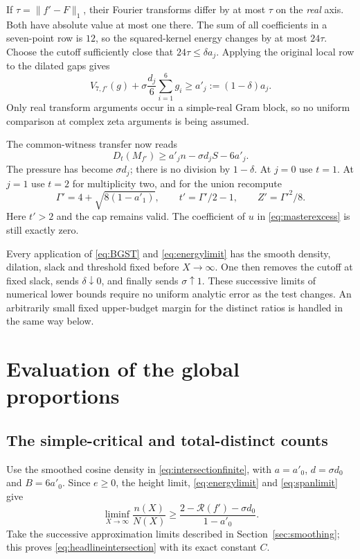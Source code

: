 \documentclass[11pt]{amsart}
\numberwithin{equation}{section}
\begin{document}
If $\tau=\|f'-F\|_1$, their Fourier transforms differ by at most
$\tau$ on the \emph{real} axis. Both have absolute value at most
one there. The sum of all coefficients in a seven-point row is
$12$, so the squared-kernel energy changes by at most $24\tau$.
Choose the cutoff sufficiently close that $24\tau\le\delta a_j$.
Applying the original local row to the dilated gaps gives
\begin{equation}
 V_{7,f'}(g)+\sigma\frac{d_j}{6}\sum_{i=1}^6g_i
       \ge a'_j:=(1-\delta)a_j.\label{eq:smoothedrow}
\end{equation}
Only real transform arguments occur in a simple-real Gram block, so
no uniform comparison at complex zeta arguments is being assumed.

The common-witness transfer now reads
\begin{equation}
 D_t(M_{f'})\ge a'_j n-\sigma d_j S-6a'_j.
 \label{eq:smootheddefect}
\end{equation}
The pressure has become $\sigma d_j$; there is no division by
$1-\delta$. At $j=0$ use $t=1$. At $j=1$ use $t=2$ for
multiplicity two, and for the union recompute
\begin{equation}
 \Gamma'=4+\sqrt{8(1-a'_1)},\qquad
 t'=\Gamma'/2-1,\qquad Z'=\Gamma'^2/8.\label{eq:slackthreshold}
\end{equation}
Here $t'>2$ and the cap remains valid. The coefficient of $u$ in
\eqref{eq:masterexcess} is still exactly zero.

Every application of \eqref{eq:BGST} and \eqref{eq:energylimit}
has the smooth density, dilation, slack and threshold fixed before
$X\to\infty$. One then removes the cutoff at fixed slack, sends
$\delta\downarrow0$, and finally sends $\sigma\uparrow1$.
These successive limits of numerical lower bounds require no
uniform analytic error as the test changes. An arbitrarily small
fixed upper-budget margin for the distinct ratios is handled in
the same way below.

\section{Evaluation of the global proportions}
\label{sec:global}

\subsection{The simple-critical and total-distinct counts}

Use the smoothed cosine density in \eqref{eq:intersectionfinite},
with $a=a'_0$, $d=\sigma d_0$ and $B=6a'_0$. Since $e\ge0$,
the height limit, \eqref{eq:energylimit} and \eqref{eq:spanlimit}
give
\[
 \liminf_{X\to\infty}\frac{n(X)}{N(X)}
 \ge\frac{2-\mathcal R(f')-\sigma d_0}{1-a'_0}.
\]
Take the successive approximation limits described in
Section~\ref{sec:smoothing}; this proves
\eqref{eq:headlineintersection} with its exact constant $C$.
\end{document}
